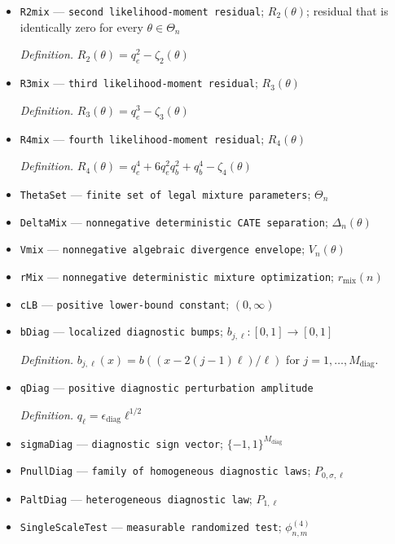 \documentclass{article}
\begin{document}
\begin{itemize}
  \item \texttt{R2mix} --- \texttt{second likelihood-\allowbreak{}moment residual}; \(R_2(\theta)\); residual that is identically zero for every \(\theta\in\Theta_n\)
  \par\smallskip\noindent\emph{Definition.} \(R_2(\theta)=q_e^2-\zeta_2(\theta)\)
  \item \texttt{R3mix} --- \texttt{third likelihood-\allowbreak{}moment residual}; \(R_3(\theta)\)
  \par\smallskip\noindent\emph{Definition.} \(R_3(\theta)=q_e^3-\zeta_3(\theta)\)
  \item \texttt{R4mix} --- \texttt{fourth likelihood-\allowbreak{}moment residual}; \(R_4(\theta)\)
  \par\smallskip\noindent\emph{Definition.} \(R_4(\theta)=q_e^4+6q_e^2q_b^2+q_b^4-\zeta_4(\theta)\)
  \item \texttt{ThetaSet} --- \texttt{finite set of legal mixture parameters}; \(\Theta_n\)
  \item \texttt{DeltaMix} --- \texttt{nonnegative deterministic CATE separation}; \(\Delta_n(\theta)\)
  \item \texttt{Vmix} --- \texttt{nonnegative algebraic divergence envelope}; \(V_n(\theta)\)
  \item \texttt{rMix} --- \texttt{nonnegative deterministic mixture optimization}; \(r_{\mathrm{mix}}(n)\)
  \item \texttt{cLB} --- \texttt{positive lower-\allowbreak{}bound constant}; \((0,\infty)\)
  \item \texttt{bDiag} --- \texttt{localized diagnostic bumps}; \(b_{j,\ell}:[0,1]\to[0,1]\)
  \par\smallskip\noindent\emph{Definition.} \(b_{j,\ell}(x)=b((x-2(j-1)\ell)/\ell)\) for \(j=1,\ldots,M_{\mathrm{diag}}\).
  \item \texttt{qDiag} --- \texttt{positive diagnostic perturbation amplitude}
  \par\smallskip\noindent\emph{Definition.} \(q_{\ell}=\epsilon_{\mathrm{diag}}\ell^{1/2}\)
  \item \texttt{sigmaDiag} --- \texttt{diagnostic sign vector}; \(\{-1,1\}^{M_{\mathrm{diag}}}\)
  \item \texttt{PnullDiag} --- \texttt{family of homogeneous diagnostic laws}; \(P_{0,\sigma,\ell}\)
  \item \texttt{PaltDiag} --- \texttt{heterogeneous diagnostic law}; \(P_{1,\ell}\)
  \item \texttt{SingleScaleTest} --- \texttt{measurable randomized test}; \(\phi_{n,m}^{(4)}\)

\end{itemize}
\end{document}
